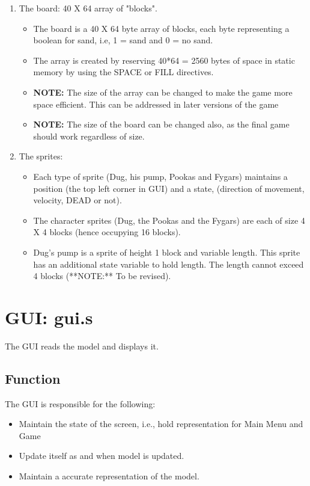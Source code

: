 \begin{enumerate}
  \item The board: 40 X 64 array of "blocks".
  \begin{itemize}
    \item The board is a 40 X 64 byte array of blocks, each byte representing a boolean for sand, i.e, 1 = sand and 0 = no sand.
    \item The array is created by reserving 40*64 = 2560 bytes of space in static memory by using the SPACE or FILL directives.
    \item \textbf{NOTE:} The size of the array can be changed to make the game more space efficient. This can be addressed in later versions of the game
    \item \textbf{NOTE:} The size of the board can be changed also, as the final game should work regardless of size.
  \end{itemize}

  \item The sprites:
  \begin{itemize}
    \item Each type of sprite (Dug, his pump, Pookas and Fygars) maintains a position (the top left corner in GUI) and a state, (direction of movement, velocity, DEAD or not).
    \item The character sprites (Dug, the Pookas and the Fygars) are each of size 4 X 4 blocks (hence occupying 16 blocks).
    \item Dug's pump is a sprite of height 1 block and variable length. This sprite has an additional state variable to hold length. The length cannot exceed 4 blocks (**NOTE:** To be revised).
  \end{itemize}
\end{enumerate}

\section{GUI: gui.s}

The GUI reads the model and displays it.

\subsection{Function}

The GUI is responsible for the following:

\begin{itemize}
  \item Maintain the state of the screen, i.e., hold representation for Main Menu and Game
  \item Update itself as and when model is updated.
  \item Maintain a accurate representation of the model.
\end{itemize}


